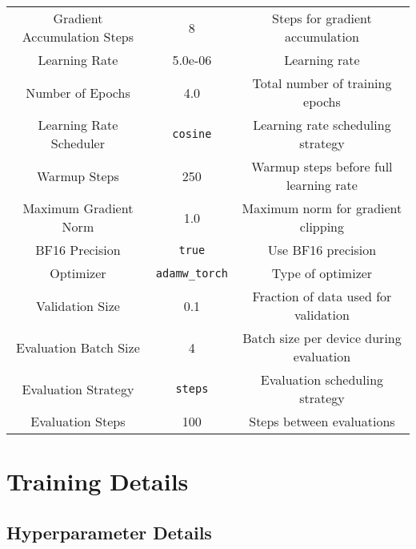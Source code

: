 \begin{table*}[ht]
\begin{tabular}{ccc}
    Gradient Accumulation Steps      & 8                                               & Steps for gradient accumulation                   \\  
    Learning Rate                    & 5.0e-06                                         & Learning rate                                     \\  
    Number of Epochs                 & 4.0                                             & Total number of training epochs                   \\  
    Learning Rate Scheduler          & \texttt{cosine}                                 & Learning rate scheduling strategy                 \\  
    Warmup Steps                     & 250                                             & Warmup steps before full learning rate            \\  
    Maximum Gradient Norm            & 1.0                                             & Maximum norm for gradient clipping                \\  
    BF16 Precision                   & \texttt{true}                                   & Use BF16 precision                                 \\ 
    Optimizer                        & \texttt{adamw\_torch}                           & Type of optimizer                                 \\  
    Validation Size                  & 0.1                                             & Fraction of data used for validation              \\  
    Evaluation Batch Size            & 4                                               & Batch size per device during evaluation           \\  
    Evaluation Strategy              & \texttt{steps}                                  & Evaluation scheduling strategy                    \\  
    Evaluation Steps                 & 100                                             & Steps between evaluations                         \\  
    \midrule
    \bottomrule    
\end{tabular}
    \end{table*}

\newpage
\section{Training Details}
\subsection{Hyperparameter Details}

